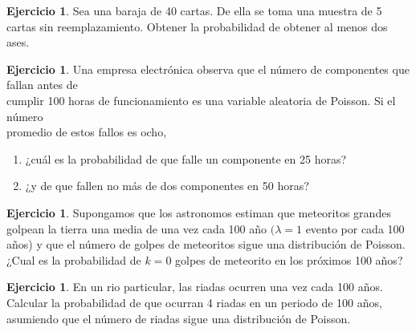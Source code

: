 \documentclass[]{article}
\providecommand{\tightlist}{%
  \setlength{\itemsep}{0pt}\setlength{\parskip}{0pt}}
\theoremstyle{plain}
\theoremstyle{definition}
\newtheorem{exercise}[theorem]{Ejercicio}
\theoremstyle{definition} %
\begin{document}
\begin{exercise}
  Sea una baraja de 40 cartas. De ella se toma una muestra de 5 cartas
  sin reemplazamiento. Obtener la probabilidad de obtener al menos dos
  ases. 
\end{exercise}

\begin{exercise}
  Una empresa electrónica observa que el número de componentes que
  fallan antes de\\
  cumplir 100 horas de funcionamiento es una variable aleatoria de
  Poisson. Si el número\\
  promedio de estos fallos es ocho,

  \begin{enumerate}
  \def\labelenumii{\arabic{enumii}.}
  \tightlist
  \item
    ¿cuál es la probabilidad de que falle un componente en 25 horas?
  \item
    ¿y de que fallen no más de dos componentes en 50 horas?
  \end{enumerate}
\end{exercise}

\begin{exercise}
  Supongamos que los astronomos estiman que meteoritos grandes golpean
  la tierra una media de una vez cada 100 año \((\lambda = 1\) evento
  por cada 100 años) y que el número de golpes de meteoritos sigue una
  distribución de Poisson. ¿Cual es la probabilidad de \(k=0\) golpes de
  meteorito en los próximos 100 años?
\end{exercise}

\begin{exercise}
  En un rio particular, las riadas ocurren una vez cada 100 años.
  Calcular la probabilidad de que ocurran 4 riadas en un periodo de 100
  años, asumiendo que el número de riadas sigue una distribución de
  Poisson.
\end{exercise}
\end{document}
